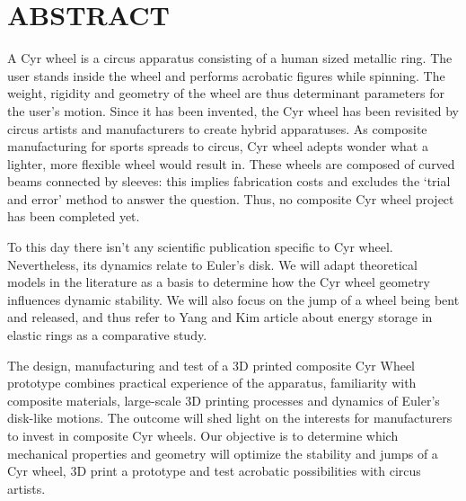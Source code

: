 %

\chapter*{ABSTRACT}\thispagestyle{headings}
%

A Cyr wheel is a circus apparatus consisting of a human sized metallic ring. The user stands inside the wheel and performs acrobatic figures while spinning. The weight, rigidity and geometry of the wheel are thus determinant parameters for the user’s motion. Since it has been invented, the Cyr wheel has been revisited by circus artists and manufacturers to create hybrid apparatuses. As composite manufacturing for sports spreads to circus, Cyr wheel adepts wonder what a lighter, more flexible wheel would result in. These wheels are composed of curved beams connected by sleeves: this implies fabrication costs and excludes the ‘trial and error’ method to answer the question. Thus, no composite Cyr wheel project has been completed yet. 

To this day there isn’t any scientific publication specific to Cyr wheel. Nevertheless, its dynamics relate to Euler’s disk. We will adapt theoretical models in the literature as a basis to determine how the Cyr wheel geometry influences dynamic stability. We will also focus on the jump of a wheel being bent and released, and thus refer to Yang and Kim article about energy storage in elastic rings as a comparative study.

The design, manufacturing and test of a 3D printed composite Cyr Wheel prototype combines practical experience of the apparatus, familiarity with composite materials, large-scale 3D printing processes and dynamics of Euler’s disk-like motions. The outcome will shed light on the interests for manufacturers to invest in composite Cyr wheels. 
Our objective is to determine which mechanical properties and geometry will optimize the stability and jumps of a Cyr wheel, 3D print a prototype and test acrobatic possibilities with circus artists.
\\
